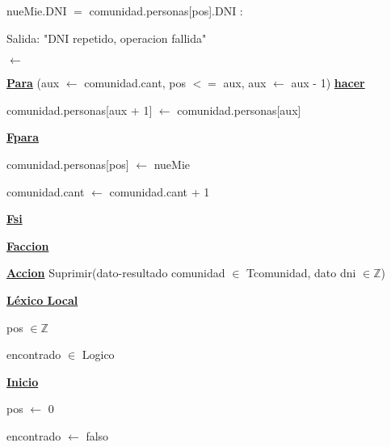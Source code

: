\documentclass{article}
\begin{document}
                            \hspace{32mm} nueMie.DNI $=$ comunidad.personas[pos].DNI : 

                                \hspace{36mm} Salida: "DNI repetido, operacion fallida"

                                \hspace{36mm} $\leftarrow$ 

            \hspace{12mm}\underline{\textbf{Para}} (aux $\leftarrow$ comunidad.cant, pos $<=$ aux, aux $\leftarrow$ aux - 1) 
            \underline{\textbf{hacer}}

                \hspace{16mm}comunidad.personas[aux + 1] $\leftarrow$ comunidad.personas[aux]

            \hspace{12mm}\underline{\textbf{Fpara}}

            \hspace{12mm}comunidad.personas[pos] $\leftarrow$ nueMie

            \hspace{12mm}comunidad.cant $\leftarrow$ comunidad.cant + 1

            \hspace{12mm}\underline{\textbf{Fsi}}

    \hspace{4mm}\underline{\textbf{Faccion}}

    \vspace{4mm}

    \hspace{4mm}\underline{\textbf{Accion}} Suprimir(dato-resultado comunidad $\in$ Tcomunidad, dato dni $\in \mathbb{Z}$)

        \hspace{8mm}\underline{\textbf{Léxico Local}}

            \hspace{12mm}pos $\in \mathbb{Z}$

            \hspace{12mm}encontrado $\in$ Logico

        \hspace{8mm}\underline{\textbf{Inicio}}

            \hspace{12mm} pos $\leftarrow$ 0

            \hspace{12mm} encontrado $\leftarrow$ falso
\end{document}
